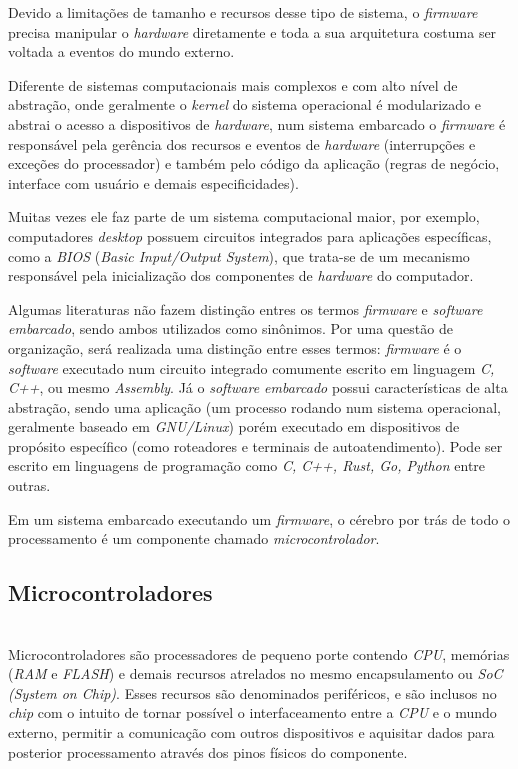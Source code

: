 \documentclass[times, twoside, watermark]{artigo}
\begin{document}
Devido a limitações de tamanho e recursos desse tipo de sistema, 
o \textit{firmware} precisa manipular o \textit{hardware} diretamente e toda a sua
 arquitetura costuma ser voltada a eventos do mundo externo.

Diferente de sistemas computacionais mais complexos e com alto nível de abstração,
onde geralmente o \textit{kernel} do sistema operacional é modularizado e abstrai
o acesso a dispositivos de \textit{hardware}\cite{tanenbaum2015modern},
num sistema embarcado o \textit{firmware} é responsável pela gerência dos recursos 
e eventos de \textit{hardware} (interrupções e exceções do processador) e também
pelo código da aplicação (regras de negócio, interface com usuário e demais especificidades).

Muitas vezes ele faz parte de um sistema computacional maior,
por exemplo, computadores \textit{desktop} possuem circuitos integrados para 
aplicações específicas, como a \textit{BIOS} (\textit{Basic Input/Output System}),
que trata-se de um mecanismo responsável pela inicialização dos
componentes de \textit{hardware} do computador. \cite{terzicbasic}

Algumas literaturas não fazem distinção entres os termos \textit{firmware} e 
\textit{software embarcado}, sendo ambos utilizados como sinônimos. Por uma
questão de organização, será realizada uma distinção entre
esses termos: \textit{firmware} é o \textit{software} executado num circuito 
integrado comumente escrito em linguagem \textit{C, C++}, ou mesmo \textit{Assembly}. 
Já o \textit{software embarcado} possui características de alta abstração, 
sendo uma aplicação (um processo rodando num sistema operacional, 
geralmente baseado em \textit{GNU/Linux})\cite{simmonds2015mastering} porém executado 
em dispositivos de propósito específico (como roteadores e terminais de autoatendimento). 
Pode ser escrito em linguagens de programação como \textit{C, C++, Rust, Go, Python} entre outras.

Em um sistema embarcado executando um \textit{firmware}, o cérebro por trás de todo o 
processamento é um componente chamado \textit{microcontrolador}.


\subsection{Microcontroladores}\hfill\\

Microcontroladores são processadores de pequeno porte contendo \textit{CPU}, 
memórias (\textit{RAM} e \textit{FLASH}) e demais
recursos atrelados no mesmo encapsulamento ou \textit{SoC (System on Chip)}.
Esses recursos são denominados periféricos, e são inclusos no \textit{chip} 
com o intuito de tornar possível o interfaceamento entre a \textit{CPU} 
e o mundo externo, permitir a comunicação com outros dispositivos e 
aquisitar dados para posterior processamento através dos pinos físicos do componente.
\end{document}
